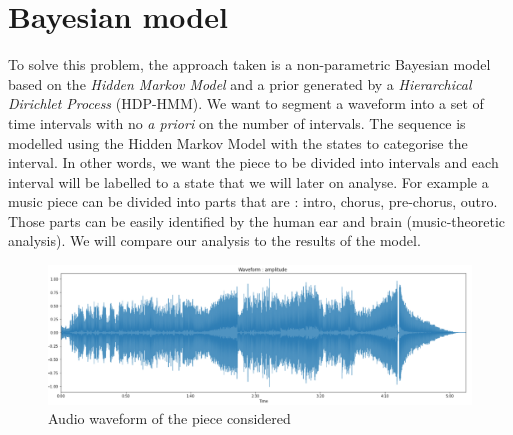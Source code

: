 
\section{Bayesian model}
\label{section:bayesmodel}
To solve this problem, the approach taken is a non-parametric Bayesian model based on the \textit{Hidden Markov Model} and a prior generated by a \textit{Hierarchical Dirichlet Process} (HDP-HMM). We want to segment a waveform into a set of time intervals with no \textit{a priori} on the number of intervals. The sequence is modelled using the Hidden Markov Model with the states to categorise the interval. In other words, we want the piece to be divided into intervals and each interval will be labelled to a state that we will later on analyse. For example a music piece can be divided into parts that are : intro, chorus, pre-chorus, outro. Those parts can be easily identified by the human ear and brain (music-theoretic analysis). We will compare our analysis to the results of the model. 

\begin{figure}[ht]
	\label{fig:waveform}
	\centering
  	\includegraphics[scale=0.5]{Graphics/Audio/waveform2} 
   	\caption{Audio waveform of the piece considered}
\end{figure}

